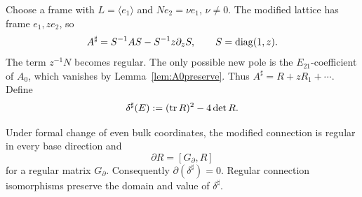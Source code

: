 Choose a frame with \(L=\langle e_1\rangle\) and
\(Ne_2=\nu e_1\), \(\nu\ne0\).  The modified lattice has frame
\(e_1,ze_2\), so
\begin{equation}
 A^\sharp=S^{-1}AS-S^{-1}z\partial_zS,
 \qquad S=\operatorname{diag}(1,z).
 \label{eq:Asharp}
\end{equation}
The term \(z^{-1}N\) becomes regular.  The only possible new pole is the
\(E_{21}\)-coefficient of \(A_0\), which vanishes by
Lemma~\ref{lem:A0preserve}.  Thus
\(A^\sharp=R+zR_1+\cdots\).  Define
\begin{equation}
 \delta^\sharp(E):=(\operatorname{tr} R)^2-4\det R.
 \label{eq:res-disc}
\end{equation}

\begin{proposition}
\label{prop:rank2-rigidity}
%
%
Under formal change of even bulk coordinates, the modified connection is
regular in every base direction and
\begin{equation}
 \partial R=[G_\partial,R]
 \label{eq:atomic-lax}
\end{equation}
for a regular matrix \(G_\partial\).  Consequently
\(\partial(\delta^\sharp)=0\).  Regular connection isomorphisms preserve the
domain and value of \(\delta^\sharp\).
\end{proposition}


